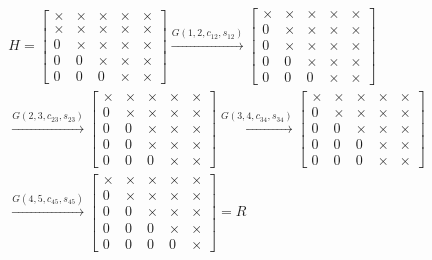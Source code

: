 \documentclass[12pt]{article}
\numberwithin{equation}{section}
\newcommand{\brak}[1]{\ensuremath{\left(#1\right)}}
\begin{document}
\begin{multline}
H = \begin{bmatrix}
\times & \times & \times & \times & \times\\
\times & \times & \times & \times & \times\\
0 & \times & \times & \times & \times\\
0 & 0 & \times & \times & \times\\
0 & 0 & 0 & \times & \times
\end{bmatrix} \xrightarrow{G\brak{1, 2, c_{12}, s_{12}}}
\begin{bmatrix}
\times & \times & \times & \times & \times\\
0 & \times & \times & \times & \times\\
0 & \times & \times & \times & \times\\
0 & 0 & \times & \times & \times\\
0 & 0 & 0 & \times & \times
\end{bmatrix} \\\xrightarrow{G\brak{2, 3, c_{23}, s_{23}}}
\begin{bmatrix}
\times & \times & \times & \times & \times\\
0 & \times & \times & \times & \times\\
0 & 0 & \times & \times & \times\\
0 & 0 & \times & \times & \times\\
0 & 0 & 0 & \times & \times
\end{bmatrix} \xrightarrow{G\brak{3, 4, c_{34}, s_{34}}}
\begin{bmatrix}
\times & \times & \times & \times & \times\\
0 & \times & \times & \times & \times\\
0 & 0 & \times & \times & \times\\
0 & 0 & 0 & \times & \times\\
0 & 0 & 0 & \times & \times
\end{bmatrix} \\\xrightarrow{G\brak{4, 5, c_{45}, s_{45}}}
\begin{bmatrix}
\times & \times & \times & \times & \times\\
0 & \times & \times & \times & \times\\
0 & 0 & \times & \times & \times\\
0 & 0 & 0 & \times & \times\\
0 & 0 & 0 & 0 & \times
\end{bmatrix} = R
\end{multline}
\end{document}
